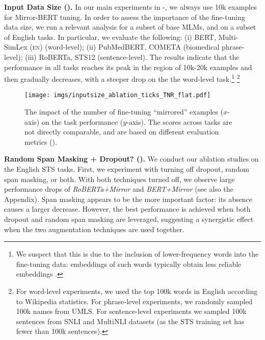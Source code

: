 \documentclass[11pt]{article}
\newcommand{\en}{{\textsc{en}}\xspace}
\begin{document}
\vspace{1.5mm}
\noindent \textbf{Input Data Size ().} In our main experiments in -, we always use 10k examples for Mirror-BERT tuning. In order to assess the importance of the fine-tuning data size, we run a relevant analysis for a subset of base MLMs, and on a subset of English tasks. In particular, we evaluate the following: (i) BERT, Multi-SimLex (\en) (word-level); (ii) PubMedBERT, COMETA (biomedical phrase-level); (iii) RoBERTa, STS12 (sentence-level). The results indicate that the performance in all tasks reaches its peak in the region of 10k-20k examples and then gradually decreases, with a steeper drop on the the word-level task.\footnote{
We suspect that this is due to the inclusion of lower-frequency words into the fine-tuning data: embeddings of such words typically obtain less reliable embeddings \cite{Pilehvar:2018emnlp}.}
\footnote{For word-level experiments, we used the top 100k words in English according to Wikipedia statistics. For phrase-level experiments, we randomly sampled 100k names from UMLS. For sentence-level experiments we sampled 100k sentences from SNLI and MultiNLI datasets (as the STS training set has fewer than 100k sentences).}

\begin{figure}[t!]
    \centering
    \texttt{[image: imgs/inputsize\_ablation\_ticks\_TNR\_flat.pdf]}
\caption{The impact of the number of fine-tuning ``mirrored'' examples ($x$-axis) on the task performance ($y$-axis). The scores across tasks are not directly comparable, and are based on different evaluation metrics ().}
    \label{fig:input_size_ablation}
\end{figure}



\vspace{1.5mm}
\noindent \textbf{Random Span Masking + Dropout? ().} 
We conduct our ablation studies on the English STS tasks. First, we experiment with turning off dropout, random span masking, or both. With both techniques turned off, we observe large performance drops of \textit{RoBERTa+Mirror} and \textit{BERT+Mirror} (see also the Appendix). Span masking appears to be the more important factor: its absence causes a larger decrease. However, the best performance is achieved when both dropout and random span masking are leveraged, suggesting a synergistic effect when the two augmentation techniques are used together. 
\end{document}
